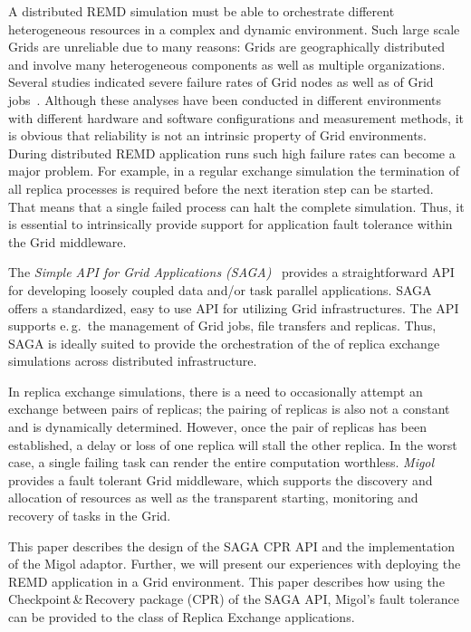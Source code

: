 \documentclass[times, 10pt,twocolumn]{article}
\begin{document}
A distributed REMD simulation must be able to orchestrate different heterogeneous 
resources in a complex and dynamic environment.  Such large scale Grids are 
unreliable due to many reasons:  Grids are 
geographically distributed and involve many heterogeneous components as well as multiple organizations. 
Several studies indicated severe failure rates of Grid nodes as well as of Grid jobs~\cite{schroeder,10.1109/E-SCIENCE.2006.93,DBLP:conf/grid/KhaliliHOSC06}. 
Although these analyses have been conducted in different environments 
with different hardware and software configurations and measurement methods, 
it is obvious that reliability is not an intrinsic property of Grid environments.
During distributed REMD application runs such high failure rates can become a major problem. 
For example, in a regular exchange simulation the termination of all replica processes is required before the next
iteration step can be started. That means that a single failed process can halt the complete simulation.  
Thus, it is essential to intrinsically provide support for application fault tolerance within the Grid middleware.


The \emph{Simple API for Grid Applications (SAGA)}~\cite{saga_gfd90}
provides a straightforward API for developing loosely coupled data and/or task
parallel applications.
SAGA offers a standardized, easy to use API for utilizing Grid
infrastructures. The API supports e.\,g.\ the management of Grid jobs,
file transfers and replicas. Thus, SAGA is ideally suited to provide
the orchestration of the of replica exchange simulations across
distributed infrastructure.
                                                         
In replica exchange simulations, there is a need to occasionally attempt an exchange
between pairs of replicas; the pairing of replicas is also not a
constant and is dynamically determined. However, once the pair of
replicas has been established, a delay or loss of one replica will
stall the other replica. In the worst case, a single failing task can
render the entire computation worthless.
\emph{Migol}~\cite{schnorLuckow08} provides a fault tolerant Grid
middleware, which supports the discovery and allocation of resources
as well as the transparent starting, monitoring and recovery of tasks in the Grid.          



This paper describes the design of the SAGA CPR API and the implementation 
of the Migol adaptor. Further, we will present our experiences with deploying  
the REMD application in a Grid environment.
This paper describes how using the Checkpoint\,\&\,Recovery package
(CPR) of the SAGA API, Migol's fault tolerance can be provided to the
class of Replica Exchange applications.   
\end{document}
